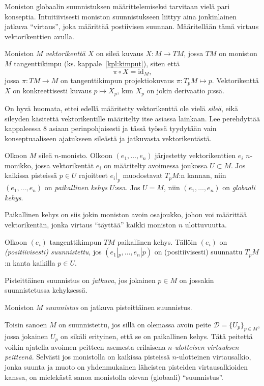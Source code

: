 Moniston globaalin suunnistuksen määrittelemiseksi tarvitaan vielä pari konseptia. Intuitiivisesti moniston suunnistukseen liittyy aina jonkinlainen jatkuva ``virtaus'', joka määrittää postiivisen suunnan. Määritellään tämä virtaus vektorikenttien avulla.
\begin{maaritelma}
    Moniston $M$ \emph{vektorikenttä $X$} on sileä kuvaus $X: M \to TM$, jossa $TM$ on moniston $M$ tangenttikimpu (ks. kappale~\ref{kpl:kimput}), siten että
    \begin{equation*}
        \pi\circ X=\text{id}_M,
    \end{equation*}
    jossa $\pi:TM\to M$ on tangenttikimpun projektiokuvaus $\pi:T_pM\mapsto p$. Vektorikenttä $X$ on konkreettisesti kuvaus $p\mapsto X_p$, kun $X_p$ on jokin derivaatio $p$:ssä.
\end{maaritelma}
On hyvä huomata, ettei edellä määritetty vektorikenttä ole vielä \emph{sileä}, eikä sileyden käsitettä vektorikentille määritelty itse asiassa lainkaan. Lee \citep{Lee2012} perehdyttää kappaleessa 8 asiaan perinpohjaisesti ja tässä työssä tyydytään vain konseptuaaliseen ajatukseen sileästä ja jatkuvasta vektorikentästä.
\begin{maaritelma}
    Olkoon $M$ sileä $n$-monisto. Olkoon $(e_1,\dots,e_n)$ järjestetty vektorikenttien $e_i$ $n$-monikko, jossa vektorikentät $e_i$ on määritelty avoimessa joukossa $U\subset M$. Jos kaikissa pisteissä $p\in U$ rajoitteet $e_i|_p$ muodostavat $T_pM$:n kannan, niin $(e_1,\dots,e_n)$ on \emph{paikallinen kehys} $U$:ssa. Jos $U=M$, niin $(e_1,\dots,e_n)$ on \emph{globaali kehys}.
\end{maaritelma}
Paikallinen kehys on siis jokin moniston avoin osajoukko, johon voi määrittää vektorikentän, jonka virtaus ``täyttää'' kaikki moniston $n$ ulottuvuutta.
\begin{maaritelma}
    Olkoon $(e_i)$ tangenttikimpun $TM$ paikallinen kehys. Tällöin $(e_i)$ on \emph{(positiivisesti) suunnistettu}, jos $(e_1|_p,\dots,e_n|p)$ on (positiivisesti) suunnattu $T_pM$:n kanta kaikilla $p\in U$.

    Pisteittäinen suunnistus on \emph{jatkuva}, jos jokainen $p\in M$ on jossakin suunnistetussa kehyksessä.

    Moniston $M$ \emph{suunnistus} on jatkuva pisteittäinen suunnistus.
\end{maaritelma}
Toisin sanoen $M$ on suunnistettu, jos sillä on olemassa avoin peite $\mathcal{D}=\{U_p\}_{p\in M}$, jossa jokainen $U_p$ on sikäli erityinen, että se on paikallinen kehys. Tätä peitettä voikin ajatella avoimen peitteen asemesta erilaisena \emph{$n$-ulotteisen virtauksen peitteenä}. Selvästi jos monistolla on kaikissa pisteissä $n$-ulotteinen virtausalkio, jonka suunta ja muoto on yhdenmukainen läheisten pisteiden virtausalkioiden kanssa, on mielekästä sanoa monistolla olevan (globaali) ``suunnistus''.